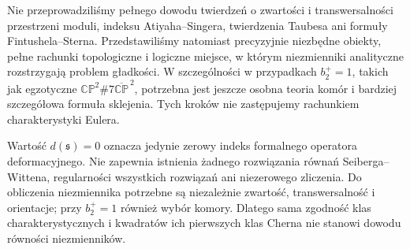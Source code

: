 \begin{uwaga}
Nie przeprowadziliśmy pełnego dowodu twierdzeń o zwartości
i transwersalności przestrzeni moduli, indeksu Atiyaha--Singera,
twierdzenia Taubesa ani formuły Fintushela--Sterna.
Przedstawiliśmy natomiast precyzyjnie niezbędne obiekty,
pełne rachunki topologiczne i logiczne miejsce, w którym
niezmienniki analityczne rozstrzygają problem gładkości.
W szczególności w przypadkach $b_2^+=1$, takich jak egzotyczne
$\mathbb{CP}^2\#7\overline{\mathbb{CP}}^{\,2}$, potrzebna
jest jeszcze osobna teoria komór i bardziej szczegółowa
formuła sklejenia. Tych kroków nie zastępujemy
rachunkiem charakterystyki Eulera.
\end{uwaga}


\begin{uwaga}
Wartość $d(\mathfrak s)=0$ oznacza jedynie zerowy indeks
formalnego operatora deformacyjnego. Nie zapewnia istnienia
żadnego rozwiązania równań Seiberga--Wittena, regularności
wszystkich rozwiązań ani niezerowego zliczenia.
Do obliczenia niezmiennika potrzebne są niezależnie
zwartość, transwersalność i orientacje; przy $b_2^+=1$
również wybór komory. Dlatego sama zgodność klas
charakterystycznych i kwadratów ich pierwszych klas
Cherna nie stanowi dowodu równości niezmienników.
\end{uwaga}

